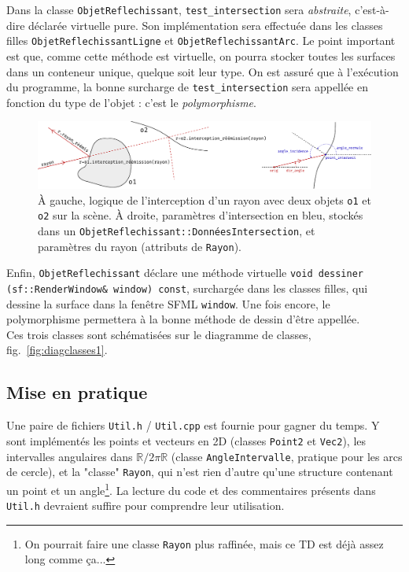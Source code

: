 \documentclass{book}
\newcommand{\inline}[1]{\texttt{#1}}
\def\filename{\texttt}
\begin{document}
Dans la classe \texttt{ObjetReflechissant}, \inline{test_intersection} sera \emph{abstraite}, c'est-à-dire déclarée virtuelle pure. Son implémentation sera effectuée dans les classes filles \texttt{ObjetReflechissantLigne} et \texttt{ObjetReflechissantArc}. Le point important est que, comme cette méthode est virtuelle, on pourra stocker toutes les surfaces dans un conteneur unique, quelque soit leur type. On est assuré que à l'exécution du programme, la bonne surcharge de \inline{test_intersection} sera appellée en fonction du type de l'objet : c'est le \emph{polymorphisme}.\\

\begin{figure}[H]
  \includegraphics[width=\textwidth]{TD5bis/intercept-reemit.pdf}
  \caption{À gauche, logique de l'interception d'un rayon avec deux objets \texttt{o1} et \texttt{o2} sur la scène. À droite, paramètres d'intersection en bleu, stockés dans un \inline{ObjetReflechissant::DonnéesIntersection}, et paramètres du rayon (attributs de \inline{Rayon}).}
  \label{fig:intercept-reemit}
\end{figure}

Enfin, \texttt{ObjetReflechissant} déclare une méthode virtuelle \inline{void dessiner (sf::RenderWindow& window) const}, surchargée dans les classes filles, qui dessine la surface dans la fenêtre SFML \inline{window}. Une fois encore, le polymorphisme permettera à la bonne méthode de dessin d'être appellée.\\

Ces trois classes sont schématisées sur le diagramme de classes, fig.\ \ref{fig:diagclasses1}. 

\subsection{Mise en pratique}

Une paire de fichiers \filename{Util.h} / \filename{Util.cpp} est fournie pour gagner du temps. Y sont implémentés les points et vecteurs en 2D (classes \inline{Point2} et \inline{Vec2}), les intervalles angulaires dans $\mathbb{R}/2\pi\mathbb{R}$ (classe \inline{AngleIntervalle}, pratique pour les arcs de cercle), et la "classe" \inline{Rayon}, qui n'est rien d'autre qu'une structure contenant un point et un angle\footnote{On pourrait faire une classe \inline{Rayon} plus raffinée, mais ce TD est déjà assez long comme ça...}. La lecture du code et des commentaires présents dans \filename{Util.h} devraient suffire pour comprendre leur utilisation.\\
\end{document}
